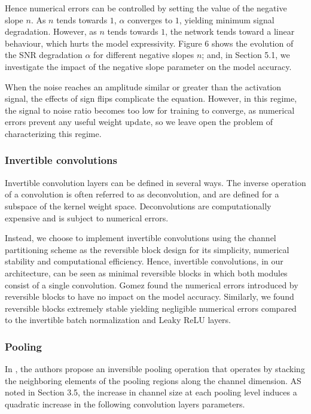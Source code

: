 \documentclass[twocolumn]{bmcart}
\begin{document}
Hence numerical errors can be controlled by setting the value of the negative slope $n$.
As $n$ tends towards $1$, $\alpha$ converges to $1$, yielding minimum signal degradation.
However, as $n$ tends towards $1$, the network tends toward a linear behaviour, which hurts the model expressivity. 
Figure 6 shows the evolution of the SNR degradation $\alpha$ for different negative slopes $n$; 
and, in Section 5.1, we investigate the impact of the negative slope parameter on the model accuracy.

When the noise reaches an amplitude similar or greater than the activation signal, 
the effects of sign flips complicate the equation. 
However, in this regime, the signal to noise ratio becomes too low for training to converge,
as numerical errors prevent any useful weight update, so we leave open the problem of characterizing this regime.

\subsubsection{Invertible convolutions}

Invertible convolution layers can be defined in several ways.
The inverse operation of a convolution is often referred to as deconvolution, 
and are defined for a subspace of the kernel weight space.
Deconvolutions are computationally expensive and is subject to numerical errors.

Instead, we choose to implement invertible convolutions using the channel partitioning scheme as the reversible block design for its simplicity, 
numerical stability and computational efficiency.
Hence, invertible convolutions, in our architecture, can be seen as minimal reversible blocks
 in which both modules consist of a single convolution.
Gomez \etal \cite{gomez2017reversible} found the numerical errors introduced by reversible blocks to have no impact on the model accuracy. 
Similarly, we found reversible blocks extremely stable yielding negligible numerical errors 
compared to the invertible batch normalization and Leaky ReLU layers.

\subsubsection{Pooling}

In \cite{jacobsen2018revnet}, the authors propose an inversible pooling operation that operates 
by stacking the neighboring elements of the pooling regions along the channel dimension.
AS noted in Section 3.5, the increase in channel size at each pooling level induces a quadratic increase in the following convolution layers parameters.
\end{document}
